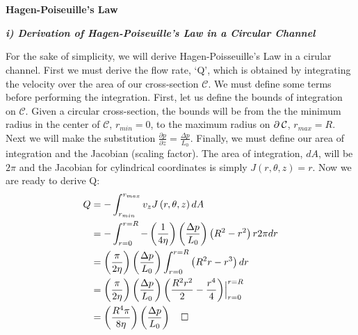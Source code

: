 \documentclass[titlepage]{article}
\begin{document}
\section{}
    \begin{center}
        \large
        \textbf{Hagen-Poiseuille's Law} \\
    \end{center} 
    \begin{center}
        \textbf{\emph{i) Derivation of Hagen-Poiseuille's Law in a Circular Channel}}
    \end{center}
    \noindent For the sake of simplicity, we will derive Hagen-Poisseuille's Law in a cirular channel. First we must derive the flow rate, `Q', which is obtained by integrating the velocity over the area of our cross-section $\mathcal{C}$. We must define some terms before performing the integration.
    First, let us define the bounds of integration on $\mathcal{C}$. Given a circular cross-section, the bounds will be from the the minimum radius in the center of $\mathcal{C}$, $r_{min}=0$, to the maximum radius on $\partial\hspace*{2pt}\mathcal{C}$, $r_{max}=R$. Next we will make the substitution $\displaystyle\frac{\partial{p}}{\partial{z}}=\displaystyle\frac{\Delta{p}}{L_{0}}$. Finally, we must define our area of integration and the Jacobian (scaling factor). The area of integration, $dA$, will be $2\pi$ and the Jacobian for cylindrical coordinates is simply $J\left(r,\theta,z\right)=r$. Now we are ready to derive Q:
    \begingroup
        \addtolength\jot{6pt}
        \begin{align}
            Q&= -\int_{r_{min}}^{r_{max}}v_{z}J\left(r,\theta,z\right)dA\\
            &= -\int_{r=0}^{r=R}-\left(\displaystyle\frac{1}{4\eta}\right)
            \left(\displaystyle\frac{\Delta{p}}{L_{0}}\right)\left(R^2-r^2\right){r}2\pi{dr} \\
            &= \left(\displaystyle\frac{\pi}{2\eta}\right)
            \left(\displaystyle\frac{\Delta{p}}{L_{0}}\right)\int_{r=0}^{r=R}\left(R^2r-r^3\right)dr \\
            &=\left(\displaystyle\frac{\pi}{2\eta}\right)
            \left(\displaystyle\frac{\Delta{p}}{L_{0}}\right)\left(\displaystyle\frac{R^2r^2}{2}-\displaystyle\frac{r^4}{4}\right)\Bigr|_{r=0}^{r=R} \\
            &=\left(\displaystyle\frac{R^4\pi}{8\eta}\right)
            \left(\displaystyle\frac{\Delta{p}}{L_{0}}\right)\hspace*{5pt}\hspace*{5pt}\square
        \end{align} 
\end{document}
